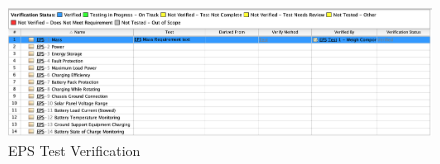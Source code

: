 \begin{figure}[H]
    \centering
    \includegraphics[width=\textwidth]{Thesis/Analysis_and_Results/Analysis and Results Figures/EPS Test Verification.png}
    \caption{EPS Test Verification}
    \label{fig:EPS Test Verification}
\end{figure}